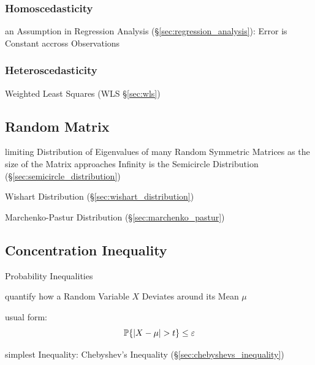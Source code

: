 \subsubsection{Homoscedasticity}\label{sec:homoscedasticity}

an Assumption in Regression Analysis (\S\ref{sec:regression_analysis}): Error is
Constant accross Observations



\subsubsection{Heteroscedasticity}\label{sec:heteroscedasticity}

Weighted Least Squares (WLS \S\ref{sec:wls})



\subsection{Random Matrix}\label{sec:random_matrix}

limiting Distribution of Eigenvalues of many Random Symmetric Matrices
as the size of the Matrix approaches Infinity is the Semicircle Distribution
(\S\ref{sec:semicircle_distribution})

Wishart Distribution (\S\ref{sec:wishart_distribution})

Marchenko-Pastur Distribution (\S\ref{sec:marchenko_pastur})



\subsection{Concentration Inequality}\label{sec:concentration_inequality}

Probability Inequalities

quantify how a Random Variable $X$ Deviates around its Mean $\mu$

usual form:
\[
  \mathbb{P}\{|X - \mu| > t\} \leq \varepsilon
\]

simplest Inequality: Chebyshev's Inequality (\S\ref{sec:chebyshevs_inequality})



